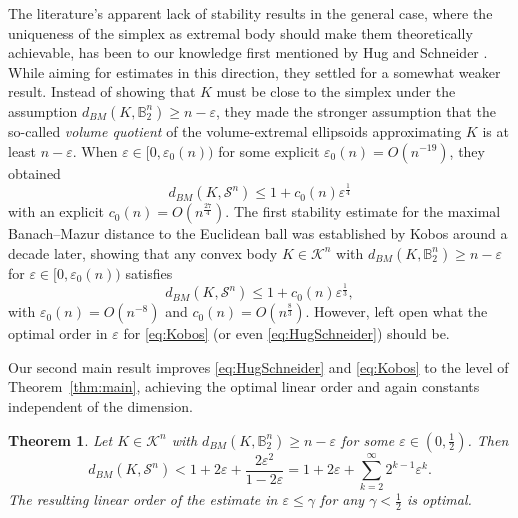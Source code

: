 \documentclass{amsart}
\newtheorem{theorem}{Theorem}[section]
\newcommand\B{\mathbb{B}}
\newcommand\CK{\mathcal{K}}
\newcommand{\simplex}[1]{\mathcal{S}^{#1}}
\begin{document}
The literature's apparent lack of stability results in the general case, where the uniqueness of the simplex as extremal body should make them theoretically achievable,
has been to our knowledge
first mentioned by Hug and Schneider \cite{2007:HugSchneider}.
While aiming for estimates in this direction,
they settled for a somewhat weaker result.
Instead of showing that $K$ must be close to the simplex under the assumption $d_{BM}(K,\B_2^n) \geq n - \varepsilon$,
they made the stronger assumption that the so-called \emph{volume quotient} of the volume-extremal ellipsoids approximating $K$ is at least $n - \varepsilon$.
When $\varepsilon \in [0,\varepsilon_0(n))$ for some explicit $\varepsilon_0(n) = O(n^{-19})$, they obtained
\begin{equation}\label{eq:HugSchneider}
    d_{BM}(K,\simplex{n})
    \leq 1 + c_0(n) \varepsilon^{\frac{1}{4}}
\end{equation}
with an explicit $c_0(n) = O(n^{\frac{27}{4}})$.
The first stability estimate for the maximal Banach--Mazur distance to the Euclidean ball
was established by Kobos \cite{2019:Kobos} around a decade later,
showing that any convex body $K \in \CK^n$
with $d_{BM}(K,\B_2^n) \geq n - \varepsilon$ for $\varepsilon \in [0,\varepsilon_0(n))$ satisfies
\begin{equation}\label{eq:Kobos}
    d_{BM}(K,\simplex{n})
    \leq 1 + c_0(n) \varepsilon^{\frac{1}{3}},
\end{equation}
with $\varepsilon_0(n) = O(n^{-8})$ and $c_0(n) = O(n^{\frac{8}{3}})$.
However, \cite{2019:Kobos} left open what the optimal order in $\varepsilon$ for \eqref{eq:Kobos} (or even \eqref{eq:HugSchneider}) should be.

Our second main result improves \eqref{eq:HugSchneider} and \eqref{eq:Kobos} to the level of Theorem~\ref{thm:main},
achieving the optimal linear order and again constants independent of the dimension.



\begin{theorem}\label{thm:DistanceBall}
Let $K\in\CK^n$ with $d_{BM}(K,\B_2^n) \geq n - \varepsilon$ for some $\varepsilon \in (0, \frac{1}{2})$.
Then
\[
    d_{BM}(K,\simplex{n})
    < 1 + 2 \varepsilon + \frac{2 \varepsilon^2}{1-2 \varepsilon}
    = 1 + 2 \varepsilon + \sum_{k = 2}^\infty 2^{k-1} \varepsilon^k.
\]
The resulting linear order of the estimate in $\varepsilon \leq \gamma$ for any $\gamma < \frac{1}{2}$ is optimal.
\end{theorem}
\end{document}
